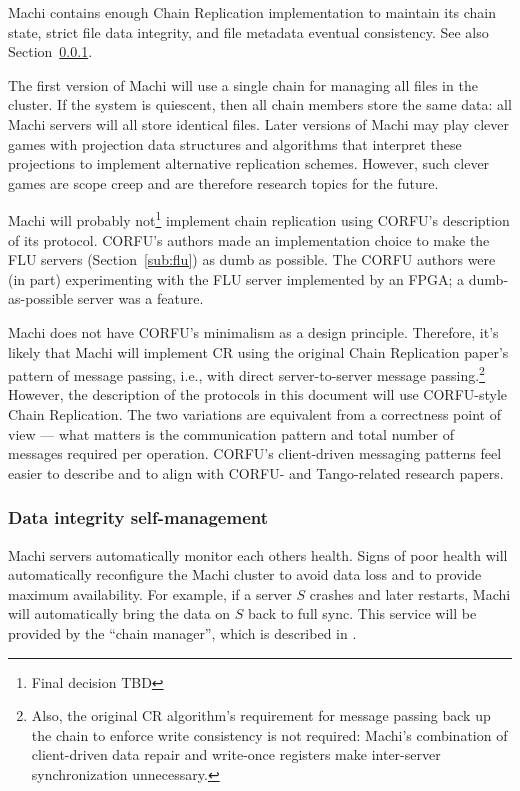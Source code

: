 \documentclass[preprint,10pt]{sigplanconf}
\begin{document}
Machi contains enough Chain Replication implementation to maintain its
chain state, strict file data integrity, and file metadata eventual
consistency.  See also Section~\ref{sub:self-management}.

The first version of Machi will use a single chain for managing all
files in the cluster.  If the system is quiescent,
then all chain members store the same data: all
Machi servers will all store identical files.  Later versions of Machi
may play clever games with projection data structures and algorithms
that interpret these projections to implement alternative replication
schemes.  However, such clever games are scope creep and are therefore
research topics for the future.

Machi will probably not\footnote{Final decision TBD} implement chain
replication using CORFU's description of its protocol.  CORFU's
authors made an implementation choice to make the FLU servers
(Section~\ref{sub:flu}) as dumb as possible.  The CORFU authors were
(in part) experimenting with the FLU server implemented by an FPGA; a
dumb-as-possible server was a feature.

Machi does not have CORFU's minimalism as a design principle.
Therefore, it's likely that Machi will implement CR using the original
Chain Replication \cite{chain-replication} paper's pattern of message
passing, i.e., with direct server-to-server message
passing.\footnote{Also, the original CR algorithm's requirement for
  message passing back up the chain to enforce write consistency is
  not required: Machi's combination of client-driven data repair and
  write-once registers make inter-server synchronization unnecessary.}
However, the
description of the protocols in this document will use CORFU-style
Chain Replication.  The two variations are equivalent from a
correctness point of view --- what matters is the communication
pattern and total number of messages required per operation.
CORFU's
client-driven messaging patterns feel easier to describe and to
align with CORFU- and Tango-related research papers.

\subsubsection{Data integrity self-management}
\label{sub:self-management}

Machi servers automatically monitor each others health.  Signs
of poor health will automatically reconfigure the Machi cluster
to avoid data loss and to provide maximum availability.
For example, if a server $S$ crashes and later
restarts, Machi will automatically bring the data on $S$ back to full sync.
This service will be provided by the ``chain manager'', which is
described in \cite{machi-chain-manager-design}.
\end{document}
